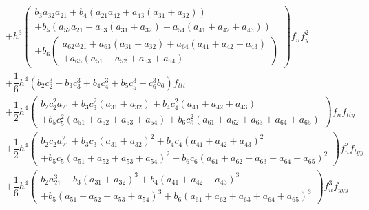 \documentclass[a4paper,oneside]{book}
\numberwithin{equation}{chapter}
\begin{document}
\begin{align}
 &+ {h^3}\left( \begin{array}{l}
{b_3}{a_{32}}{a_{21}} + {b_4}\left( {{a_{21}}{a_{42}} + {a_{43}}\left( {{a_{31}} + {a_{32}}} \right)} \right)\\
 + {b_5}\left( {{a_{52}}{a_{21}} + {a_{53}}\left( {{a_{31}} + {a_{32}}} \right) + {a_{54}}\left( {{a_{41}} + {a_{42}} + {a_{43}}} \right)} \right)\\
 + {b_6}\left( \begin{array}{l}
{a_{62}}{a_{21}} + {a_{63}}\left( {{a_{31}} + {a_{32}}} \right) + {a_{64}}\left( {{a_{41}} + {a_{42}} + {a_{43}}} \right)\\
 + {a_{65}}\left( {{a_{51}} + {a_{52}} + {a_{53}} + {a_{54}}} \right)
\end{array} \right)
\end{array} \right){f_n}f_y^2\\
 &+ \dfrac{1}{6}{h^4}\left( {{b_2}c_2^3 + {b_3}c_3^3 + {b_4}c_4^3 + {b_5}c_5^3 + c_6^3{b_6}} \right){f_{ttt}}\\
& + \dfrac{1}{2}{h^4}\left( \begin{array}{l}
{b_2}c_2^2{a_{21}} + {b_3}c_3^2\left( {{a_{31}} + {a_{32}}} \right) + {b_4}c_4^2\left( {{a_{41}} + {a_{42}} + {a_{43}}} \right)\\
+ {b_5}c_5^2\left( {{a_{51}} + {a_{52}} + {a_{53}} + {a_{54}}} \right) + {b_6}c_6^2\left( {{a_{61}} + {a_{62}} + {a_{63}} + {a_{64}} + {a_{65}}} \right)
\end{array} \right){f_n}{f_{tty}}\\
& + \dfrac{1}{2}{h^4}\left( \begin{array}{l}
{b_2}{c_2}a_{21}^2 + {b_3}{c_3}{\left( {{a_{31}} + {a_{32}}} \right)^2} + {b_4}{c_4}{\left( {{a_{41}} + {a_{42}} + {a_{43}}} \right)^2}\\
 + {b_5}{c_5}{\left( {{a_{51}} + {a_{52}} + {a_{53}} + {a_{54}}} \right)^2} + {b_6}{c_6}{\left( {{a_{61}} + {a_{62}} + {a_{63}} + {a_{64}} + {a_{65}}} \right)^2}
\end{array} \right)f_n^2{f_{tyy}}\\
& + \dfrac{1}{6}{h^4}\left( \begin{array}{l}
{b_2}a_{21}^3 + {b_3}{\left( {{a_{31}} + {a_{32}}} \right)^3} + {b_4}{\left( {{a_{41}} + {a_{42}} + {a_{43}}} \right)^3}\\
 + {b_5}{\left( {{a_{51}} + {a_{52}} + {a_{53}} + {a_{54}}} \right)^3} + {b_6}{\left( {{a_{61}} + {a_{62}} + {a_{63}} + {a_{64}} + {a_{65}}} \right)^3}
\end{array} \right)f_n^3{f_{yyy}}\\

\end{align}
\end{document}
